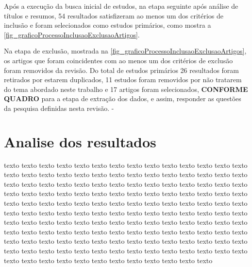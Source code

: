 Após a execução da busca inicial de estudos, na etapa seguinte após análise de títulos e resumos, 54 resultados satisfizeram ao menos um dos critérios de inclusão e foram selecionados como estudos primários, como mostra a \autoref{fig_graficoProcessoInclusaoExclusaoArtigos}. 

Na etapa de exclusão, mostrada na \autoref{fig_graficoProcessoInclusaoExclusaoArtigos}, os artigos que foram coincidentes com ao menos um dos critérios de exclusão foram removidos da revisão. Do total de estudos primários 26 resultados foram retirados por estarem duplicados, 11 estudos foram removidos por não tratarem do tema abordado neste trabalho e 17 artigos foram selecionados,\textbf{ CONFORME QUADRO } para a etapa de extração dos dados, e assim, responder as questões da pesquisa definidas nesta revisão.  
- 

\section{Analise dos resultados}
texto texto texto texto texto texto texto texto texto texto texto texto texto texto texto texto texto texto texto texto texto texto texto texto texto texto texto texto texto texto texto texto texto texto texto texto texto texto texto texto texto texto texto texto texto texto texto texto texto texto texto texto texto texto texto texto texto texto texto texto texto texto texto texto texto texto texto texto texto texto texto texto texto texto texto texto texto texto texto texto texto texto texto texto texto texto texto texto texto texto texto texto texto texto texto texto texto texto texto texto texto texto texto texto texto texto texto texto texto texto texto texto texto texto texto texto texto texto texto texto texto texto texto texto texto texto texto texto texto texto texto texto texto texto texto texto texto texto texto texto texto texto texto texto texto texto texto texto texto texto texto texto 